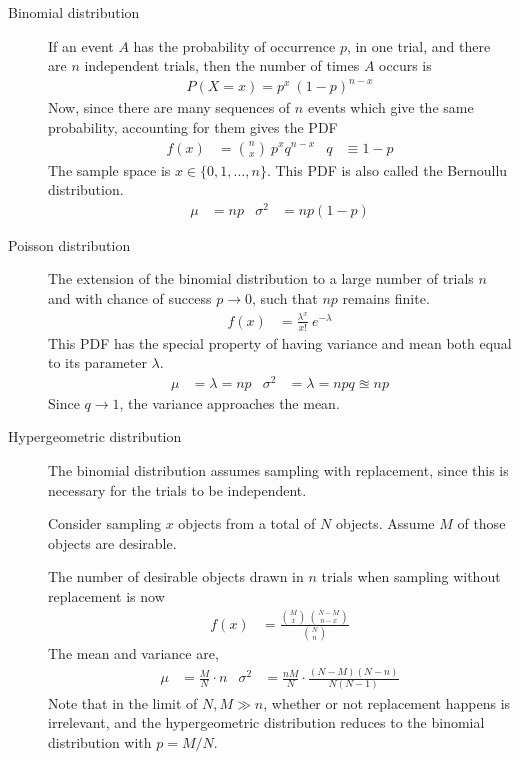 \begin{description}
    \item[Binomial distribution] If an event $ A $ has the probability of occurrence
          $ p $, in one trial, and there are $ n $ independent trials, then the number
          of times $ A $ occurs is
          \begin{align}
              P(X=x) = p^x\ (1-p)^{n-x}
          \end{align}
          Now, since there are many sequences of $ n $ events which give the same
          probability, accounting for them gives the PDF
          \begin{align}
              f(x) & = \binom{n}{x}\ p^x q^{n-x} & q & \equiv 1-p
          \end{align}
          The sample space is $ x \in \{0,1,\dots,n\} $. This PDF is also called the
          Bernoullu distribution.
          \begin{align}
              \mu & = np & \sigma^2 & = np(1-p)
          \end{align}

    \item[Poisson distribution] The extension of the binomial distribution to a large
          number of trials $ n $ and with chance of success $ p \to 0 $, such that $ np $
          remains finite.
          \begin{align}
              f(x) & = \frac{\lambda^x}{x!}\ e^{-\lambda}
          \end{align}
          This PDF has the special property of having variance and mean both equal to
          its parameter $ \lambda $.
          \begin{align}
              \mu & = \lambda = np & \sigma^2 & = \lambda = npq \approxeq np
          \end{align}
          Since $ q \to 1 $, the variance approaches the mean.

    \item[Hypergeometric distribution] The binomial distribution assumes sampling
          with replacement, since this is necessary for the trials to be independent.
          \par
          Consider sampling $ x $ objects from a total of $ N $ objects. Assume $ M $
          of those objects are desirable. \par
          The number of desirable objects drawn in $ n $ trials when sampling without
          replacement is now
          \begin{align}
              f(x) & = \frac{\binom{M}{x}\ \binom{N-M}{n-x}}{\binom{N}{n}}
          \end{align}
          The mean and variance are,
          \begin{align}
              \mu      & = \frac{M}{N} \cdot n                          &
              \sigma^2 & = \frac{nM}{N} \cdot \frac{(N-M)(N-n)}{N(N-1)}
          \end{align}
          Note that in the limit of $ N,M \gg n $, whether or not replacement happens
          is irrelevant, and the hypergeometric distribution reduces to the binomial
          distribution with $ p = M/N $.
\end{description}

